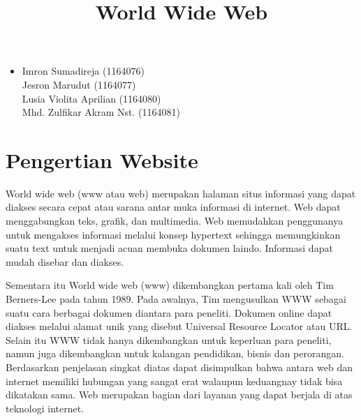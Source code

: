 \documentclass[12pt, a4paper]{article}
\begin{document}
\title{World Wide Web}
\maketitle

\begin{itemize}
\item
	Imron Sumadireja (1164076) \\
	Jesron Marudut (1164077) \\
	Lusia Violita Aprilian (1164080) \\
	Mhd. Zulfikar Akram Nst. (1164081) \\
\end{itemize}

\section{Pengertian Website}
World wide web (www atau web) merupakan halaman situs informasi yang dapat diakses secara cepat atau sarana antar muka informasi di internet. Web dapat menggabungkan teks, grafik, dan multimedia. Web memudahkan penggunanya untuk mengakses informasi melalui konsep hypertext sehingga memungkinkan  suatu text untuk menjadi acuan membuka dokumen laindo. Informasi dapat mudah disebar dan diakses.

Sementara itu World wide web (www) dikembangkan pertama kali oleh Tim Berners-Lee pada tahun 1989. Pada awalnya, Tim mengusulkan WWW sebagai suatu cara berbagai dokumen diantara para peneliti. Dokumen online dapat diakses melalui alamat unik yang disebut Universal Resource Locator atau URL. Selain itu WWW tidak hanya dikembangkan untuk keperluan para peneliti, namun juga dikembangkan untuk kalangan pendidikan, bisnis dan perorangan. Berdasarkan penjelasan singkat diatas dapat disimpulkan bahwa antara web dan internet memiliki hubungan yang sangat erat walaupun keduangnay tidak bisa dikatakan sama. Web merupakan bagian dari layanan yang dapat berjala di atas teknologi internet.
\end{document}
